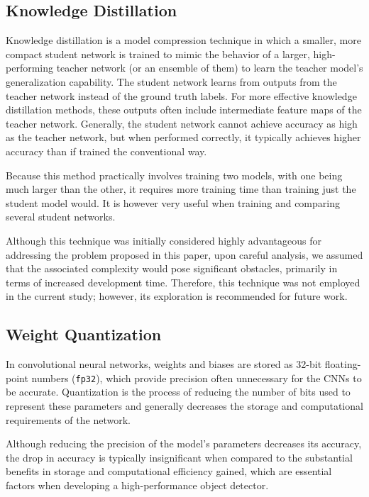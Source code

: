 \subsection{Knowledge Distillation}

Knowledge distillation is a model compression technique in which a smaller, more
compact student network is trained to mimic the behavior of a larger,
high-performing teacher network (or an ensemble of them) to learn the teacher
model's generalization capability. The student network learns from outputs from
the teacher network instead of the ground truth labels. For more effective
knowledge distillation methods, these outputs often include intermediate feature
maps of the teacher network. Generally, the student network cannot achieve
accuracy as high as the teacher network, but when performed correctly, it
typically achieves higher accuracy than if trained the conventional way.


Because this method practically involves training two models, with one being
much larger than the other, it requires more training time than training just
the student model would. It is however very useful when training and comparing
several student networks.

Although this technique was initially considered highly advantageous for
addressing the problem proposed in this paper, upon careful analysis, we assumed
that the associated complexity would pose significant obstacles, primarily in
terms of increased development time. Therefore, this technique was not employed
in the current study; however, its exploration is recommended for future work.


\subsection{Weight Quantization}


In convolutional neural networks, weights and biases are stored as 32-bit
floating-point numbers (\texttt{fp32}), which provide precision often
unnecessary for the CNNs to be accurate. Quantization is the process of reducing
the number of bits used to represent these parameters and generally decreases
the storage and computational requirements of the network.

Although reducing the precision of the model's parameters decreases its
accuracy, the drop in accuracy is typically insignificant when compared to the
substantial benefits in storage and computational efficiency gained, which are
essential factors when developing a high-performance object detector.

